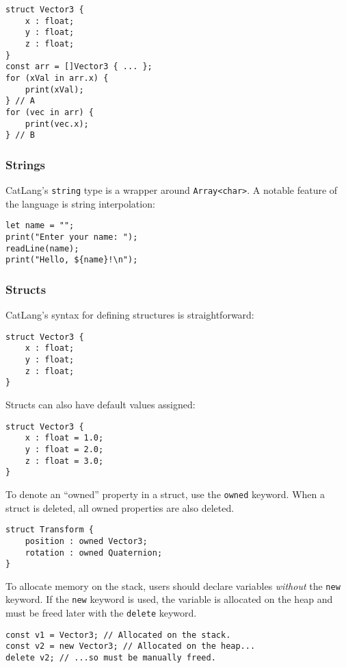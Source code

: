 \documentclass[12pt]{article}
\begin{document}
\begin{lstlisting}
struct Vector3 {
	x : float;
	y : float;
	z : float;
}
const arr = []Vector3 { ... };
for (xVal in arr.x) {
	print(xVal);
} // A
for (vec in arr) {
	print(vec.x);
} // B
\end{lstlisting}

\subsubsection{Strings}

CatLang's \lstinline!string! type is a wrapper around \lstinline!Array<char>!. A notable feature of the language is string interpolation:

\begin{lstlisting}
let name = "";
print("Enter your name: ");
readLine(name);
print("Hello, ${name}!\n");
\end{lstlisting}

\subsubsection{Structs}

CatLang's syntax for defining structures is straightforward:

\begin{lstlisting}
struct Vector3 {
	x : float;
	y : float;
	z : float;
}
\end{lstlisting}

Structs can also have default values assigned:

\begin{lstlisting}
struct Vector3 {
	x : float = 1.0;
	y : float = 2.0;
	z : float = 3.0;
}
\end{lstlisting}

To denote an ``owned'' property in a struct, use the \lstinline$owned$ keyword. When a struct is deleted, all owned properties are also deleted.

\begin{lstlisting}
struct Transform {
	position : owned Vector3;
	rotation : owned Quaternion;
}
\end{lstlisting}

To allocate memory on the stack, users should declare variables \emph{without} the \lstinline!new! keyword. If the \lstinline!new! keyword is used, the variable is allocated on the heap and must be freed later with the \lstinline!delete! keyword.

\begin{lstlisting}
const v1 = Vector3; // Allocated on the stack.
const v2 = new Vector3; // Allocated on the heap...
delete v2; // ...so must be manually freed.
\end{lstlisting}
\end{document}

